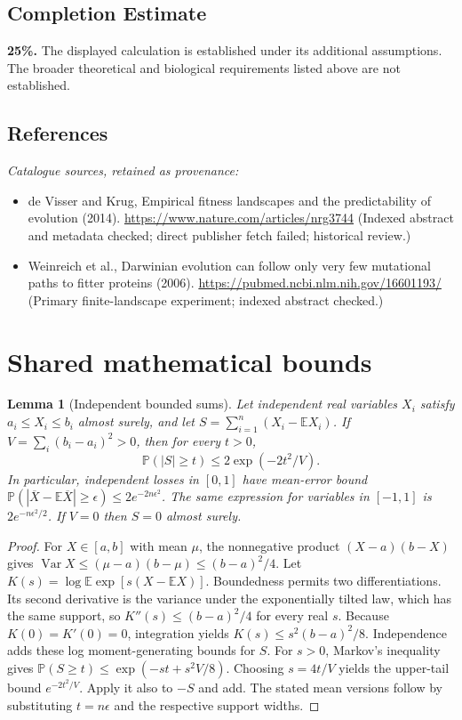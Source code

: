 \documentclass[11pt]{article}
\newcommand{\E}{\mathbb E}
\newcommand{\Prob}{\mathbb P}
\DeclareMathOperator{\Var}{Var}
\providecommand{\E}{\mathbb E}
\providecommand{\Prob}{\mathbb P}
\providecommand{\Var}{\operatorname{Var}}
\newtheorem{sharedlemma}{Lemma}[section]
\begin{document}
\subsection{Completion Estimate}
\textbf{25\%.} The displayed calculation is established under its additional assumptions. The broader theoretical and biological requirements listed above are not established.
\subsection{References}
\noindent\emph{Catalogue sources, retained as provenance:}
\begin{itemize}
\item de Visser and Krug, Empirical fitness landscapes and the predictability of evolution (2014). \url{https://www.nature.com/articles/nrg3744} (Indexed abstract and metadata checked; direct publisher fetch failed; historical review.)
\item Weinreich et al., Darwinian evolution can follow only very few mutational paths to fitter proteins (2006). \url{https://pubmed.ncbi.nlm.nih.gov/16601193/} (Primary finite-landscape experiment; indexed abstract checked.)
\end{itemize}
\clearpage


\appendix
\section{Shared mathematical bounds}\label{app:bounds}
\begin{sharedlemma}[Independent bounded sums]\label{lem:bounded}
Let independent real variables $X_i$ satisfy $a_i\leq X_i\leq b_i$ almost surely,
and let $S=\sum_{i=1}^n(X_i-\E X_i)$. If
$V=\sum_i(b_i-a_i)^2>0$, then for every $t>0$,
\[
 \Prob(|S|\geq t)\leq 2\exp(-2t^2/V).
\]
In particular, independent losses in $[0,1]$ have mean-error bound
$\Prob(|\overline X-\E\overline X|\geq\epsilon)
\leq2e^{-2n\epsilon^2}$. The same expression for variables in $[-1,1]$
is $2e^{-n\epsilon^2/2}$. If $V=0$ then $S=0$ almost surely.
\end{sharedlemma}
\begin{proof}
For $X\in[a,b]$ with mean $\mu$, the nonnegative product
$(X-a)(b-X)$ gives
$\Var X\leq(\mu-a)(b-\mu)\leq(b-a)^2/4$.
Let $K(s)=\log\E\exp[s(X-\E X)]$.
Boundedness permits two differentiations. Its second derivative is the variance
under the exponentially tilted law, which has the same support, so
$K''(s)\leq(b-a)^2/4$ for every real $s$.
Because $K(0)=K'(0)=0$, integration yields
$K(s)\leq s^2(b-a)^2/8$.
Independence adds these log moment-generating bounds for $S$.
For $s>0$, Markov's inequality gives
$\Prob(S\geq t)\leq\exp(-st+s^2V/8)$.
Choosing $s=4t/V$ yields the upper-tail bound $e^{-2t^2/V}$.
Apply it also to $-S$ and add. The stated mean versions follow by substituting
$t=n\epsilon$ and the respective support widths.
\end{proof}
\end{document}
